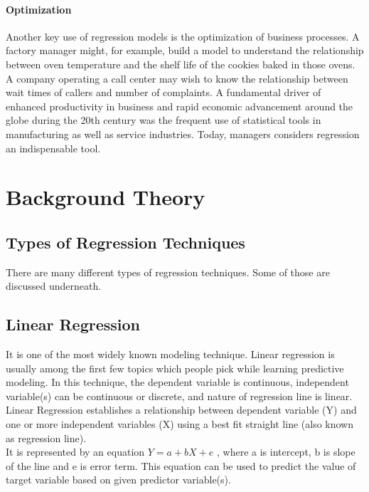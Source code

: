 \documentclass[11pt, a4paper]{report}
\begin{document}
\subsubsection{Optimization}
Another key use of regression models is the optimization of business processes. A factory manager might, for example, build a model to understand the relationship between oven temperature and the shelf life of the cookies baked in those ovens. A company operating a call center may wish to know the relationship between wait times of callers and number of complaints. A fundamental driver of enhanced productivity in business and rapid economic advancement around the globe during the 20th century was the frequent use of statistical tools in manufacturing as well as service industries. Today, managers considers regression an indispensable tool. \cite{desc:RegressionApplication}

	

\newpage

\chapter{Background Theory}


\section*{Types of Regression Techniques}
There are many different types of regression techniques. Some of those are discussed underneath.

\section{Linear Regression}

It is one of the most widely known modeling technique. Linear regression is usually among the first few topics which people pick while learning predictive modeling. In this technique, the dependent variable is continuous, independent variable(s) can be continuous or discrete, and nature of regression line is linear. \\

Linear Regression establishes a relationship between dependent variable (Y) and one or more independent variables (X) using a best fit straight line (also known as regression line). \\

It is represented by an equation $ Y=a+bX + e $ , where a is intercept, b is slope of the line and e is error term. This equation can be used to predict the value of target variable based on given predictor variable(s).
\end{document}
